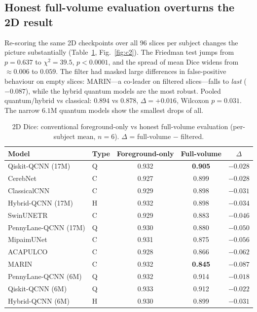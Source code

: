 \documentclass[runningheads]{llncs}
\begin{document}
\subsection{Honest full-volume evaluation overturns the 2D result}
Re-scoring the same 2D checkpoints over all $96$ slices per subject changes the
picture substantially (Table~\ref{tab:c2}, Fig.~\ref{fig:c2}). The Friedman
test jumps from $p{=}0.637$ to $\chi^2{=}39.5$, $p{<}0.0001$, and the spread of
mean Dice widens from ${\approx}0.006$ to $0.059$. The filter had masked large
differences in false-positive behaviour on empty slices: MARIN---a co-leader on
filtered slices---falls to \emph{last} ($-0.087$), while the hybrid quantum
models are the most robust. Pooled quantum/hybrid vs classical:
$0.894$ vs $0.878$, $\Delta{=}{+}0.016$, Wilcoxon $p{=}0.031$. The narrow
$6.1$M quantum models show the smallest drops of all.

\begin{table}[t]
\centering
\caption{2D Dice: conventional foreground-only vs honest full-volume
evaluation (per-subject mean, $n{=}6$). $\Delta$ = full-volume $-$ filtered.}
\label{tab:c2}
\setlength{\tabcolsep}{6pt}
\begin{tabular}{llccc}
\toprule
Model & Type & Foreground-only & Full-volume & $\Delta$\\
\midrule
Qiskit-QCNN (17M)    & Q & 0.932 & \textbf{0.905} & $-0.028$\\
CerebNet             & C & 0.927 & 0.899 & $-0.028$\\
ClassicalCNN         & C & 0.929 & 0.898 & $-0.031$\\
Hybrid-QCNN (17M)    & H & 0.932 & 0.898 & $-0.034$\\
SwinUNETR            & C & 0.929 & 0.883 & $-0.046$\\
PennyLane-QCNN (17M) & Q & 0.930 & 0.880 & $-0.050$\\
MipaimUNet           & C & 0.931 & 0.875 & $-0.056$\\
ACAPULCO             & C & 0.928 & 0.866 & $-0.062$\\
MARIN                & C & 0.932 & \textbf{0.845} & $-0.087$\\
\midrule
PennyLane-QCNN (6M)  & Q & 0.932 & 0.914 & $-0.018$\\
Qiskit-QCNN (6M)     & Q & 0.933 & 0.912 & $-0.022$\\
Hybrid-QCNN (6M)     & H & 0.930 & 0.899 & $-0.031$\\
\bottomrule
\end{tabular}
\end{table}
\end{document}
